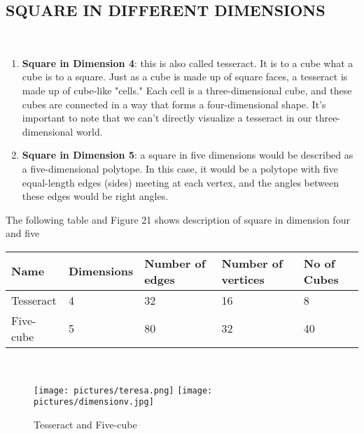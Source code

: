 \documentclass{article}
\begin{document}
\subsection{SQUARE IN DIFFERENT DIMENSIONS}\\

\begin{enumerate}
    \item \textbf{Square in Dimension 4}: this is also called  tesseract. It is to a cube what a cube is to a square. Just as a cube is made up of square faces, a tesseract is made up of cube-like "cells." Each cell is a three-dimensional cube, and these cubes are connected in a way that forms a four-dimensional shape. It's important to note that we can't directly visualize a tesseract in our three-dimensional world.

    \item \textbf{Square in Dimension 5}: a square in five dimensions would be described as a five-dimensional polytope. In this case, it would be a polytope with five equal-length edges (sides) meeting at each vertex, and the angles between these edges would be right angles.
    \end{enumerate}
The following table and Figure 21 shows description of square in dimension four and five\\

\begin{tabular}{| l | l | l |l |l |}
\hline
Name& 	Dimensions& Number of edges& Number of vertices& No of Cubes\\
\hline
Tesseract& 	4& 	32& 16& 8\\
\hline
Five-cube& 	5& 	80& 32 & 40\\
\hline
\end{tabular}\\


\begin{figure}[htp]
     \texttt{[image: pictures/teresa.png]}
     \texttt{[image: pictures/dimensionv.jpg]}
     \caption{Tesseract and Five-cube}
\end{figure}
\end{document}
